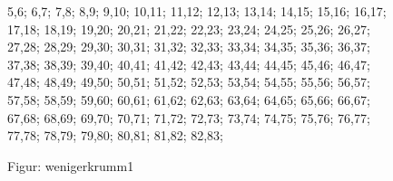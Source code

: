 \documentclass[a4paper,10pt,ngerman]{scrartcl}
\begin{document}
\begin{figure}[!h]
{            5,6;
            6,7;
            7,8;
            8,9;
            9,10;
            10,11;
            11,12;
            12,13;
            13,14;
            14,15;
            15,16;
            16,17;
            17,18;
            18,19;
            19,20;
            20,21;
            21,22;
            22,23;
            23,24;
            24,25;
            25,26;
            26,27;
            27,28;
            28,29;
            29,30;
            30,31;
            31,32;
            32,33;
            33,34;
            34,35;
            35,36;
            36,37;
            37,38;
            38,39;
            39,40;
            40,41;
            41,42;
            42,43;
            43,44;
            44,45;
            45,46;
            46,47;
            47,48;
            48,49;
            49,50;
            50,51;
            51,52;
            52,53;
            53,54;
            54,55;
            55,56;
            56,57;
            57,58;
            58,59;
            59,60;
            60,61;
            61,62;
            62,63;
            63,64;
            64,65;
            65,66;
            66,67;
            67,68;
            68,69;
            69,70;
            70,71;
            71,72;
            72,73;
            73,74;
            74,75;
            75,76;
            76,77;
            77,78;
            78,79;
            79,80;
            80,81;
            81,82;
            82,83;
        }
        \caption{Figur: wenigerkrumm1}
        \label{fig:wenigerkrumm1}
    \end{figure}
    \newpage
\end{document}
